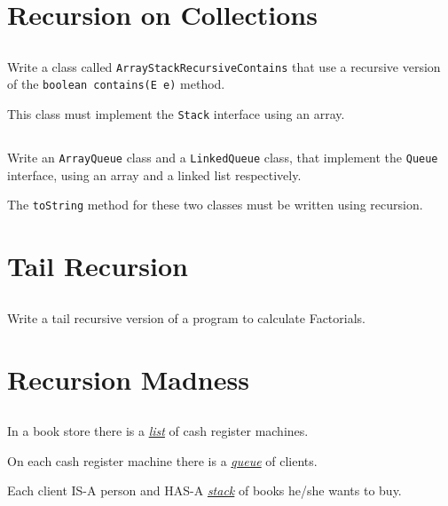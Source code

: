\documentclass[a4paper, 11pt]{article}
\begin{document}
\section{Recursion on Collections}

\subsection{}

Write a class called \texttt{ArrayStackRecursiveContains} that use a recursive
version of the \texttt{boolean contains(E e)} method.

This class must implement the \texttt{Stack} interface using an array.


\subsection{}

Write an \texttt{ArrayQueue} class and a \texttt{LinkedQueue} class, that
implement the \texttt{Queue} interface, using an array and a linked list
respectively.

The \texttt{toString} method for these two classes must be written using recursion.


\section{Tail Recursion}

\subsection{}

Write a tail recursive version of a program to calculate Factorials.



\section{Recursion Madness}

\subsection{}

In a book store there is a \underline{\textsl{list}} of cash register machines.

On each cash register machine there is a \underline{\textsl{queue}} of clients.

Each client IS-A person and HAS-A \underline{\textsl{stack}} of books he/she wants to buy.
\end{document}
